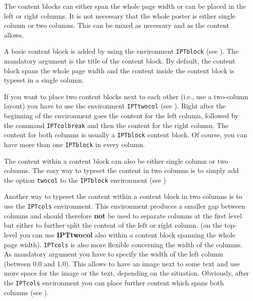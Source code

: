 The content blocks can either span the whole page width or can be placed in the left or right columns. It is not necessary that the whole poster is either single column or two columns. This can be mixed as necessary and as the content allows.

A basic content block is added by using the environment \texttt{IPTblock} (see ). The mandatory argument is the title of the content block. By default, the content block spans the whole page width and the content inside the content block is typeset in a single column.


If you want to place two content blocks next to each other (i.e., use a two-column layout) you have to use the environment \texttt{IPTtwocol} (see ). Right after the beginning of the environment goes the content for the left column, followed by the command \texttt{\bs{}IPTcolbreak} and then the content for the right column. The content for both columns is usually a \texttt{IPTblock} content block. Of course, you can have more than one \texttt{IPTblock} in every column.



The content within a content block can also be either single column or two columns. The easy way to typeset the content in two columns is to simply add the option \texttt{twocol} to the \texttt{IPTblock} environment (see )



Another way to typeset the content within a content block in two columns is to use the \texttt{IPTcols} environment. This environment produces a smaller gap between columns and should therefore \textbf{not} be used to separate columns at the first level but either to further split the content of the left or right column. (on the top-level you can use \textbf{IPTtwocol} also within a content block spanning the whole page width). \texttt{IPTcols} is also more flexible concerning the width of the columns. As mandatory argument you have to specify the width of the left column (between 0.0 and 1.0). This allows to have an image next to some text and use more space for the image or the text, depending on the situation. Obviously, after the \texttt{IPTcols} environment you can place further content which spans both columns (see ). 

